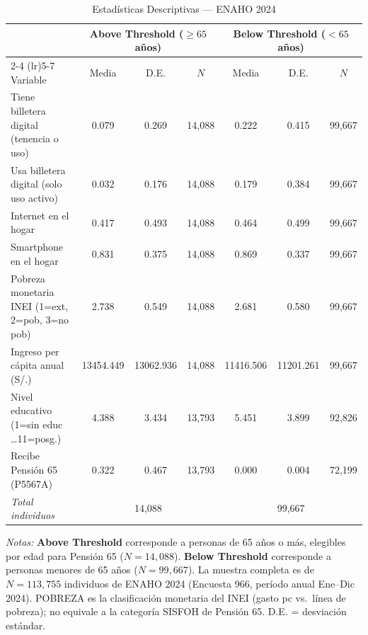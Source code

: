 \begin{table}[htbp]
\centering
\caption{Estadísticas Descriptivas — ENAHO 2024}
\label{tab:descriptivos}
\begin{threeparttable}
\begin{tabular}{l ccc ccc}
\toprule
& \multicolumn{3}{c}{\textbf{Above Threshold} ($\geq 65$ años)} & \multicolumn{3}{c}{\textbf{Below Threshold} ($< 65$ años)} \\
\cmidrule(lr){2-4} \cmidrule(lr){5-7}
Variable & Media & D.E. & $N$ & Media & D.E. & $N$ \\
\midrule
  Tiene billetera digital (tenencia o uso) & 0.079 & 0.269 & 14{,}088 & 0.222 & 0.415 & 99{,}667 \\
  Usa billetera digital (solo uso activo) & 0.032 & 0.176 & 14{,}088 & 0.179 & 0.384 & 99{,}667 \\
  Internet en el hogar & 0.417 & 0.493 & 14{,}088 & 0.464 & 0.499 & 99{,}667 \\
  Smartphone en el hogar & 0.831 & 0.375 & 14{,}088 & 0.869 & 0.337 & 99{,}667 \\
  Pobreza monetaria INEI (1=ext, 2=pob, 3=no pob) & 2.738 & 0.549 & 14{,}088 & 2.681 & 0.580 & 99{,}667 \\
  Ingreso per cápita anual (S/.) & 13454.449 & 13062.936 & 14{,}088 & 11416.506 & 11201.261 & 99{,}667 \\
  Nivel educativo (1=sin educ \ldots 11=posg.) & 4.388 & 3.434 & 13{,}793 & 5.451 & 3.899 & 92{,}826 \\
  Recibe Pensión 65 (P5567A) & 0.322 & 0.467 & 13{,}793 & 0.000 & 0.004 & 72{,}199 \\
\midrule
  \textit{Total individuos} & \multicolumn{3}{c}{14{,}088} & \multicolumn{3}{c}{99{,}667} \\
\bottomrule
\end{tabular}
\begin{tablenotes}[flushleft]
\footnotesize
\item \textit{Notas:} \textbf{Above Threshold} corresponde a personas de 65 años o más, elegibles por edad para Pensión 65 ($N=14{,}088$). \textbf{Below Threshold} corresponde a personas menores de 65 años ($N=99{,}667$). La muestra completa es de $N=113{,}755$ individuos de ENAHO 2024 (Encuesta 966, período anual Ene--Dic 2024). POBREZA es la clasificación monetaria del INEI (gasto pc vs.\ línea de pobreza); no equivale a la categoría SISFOH de Pensión 65. D.E. = desviación estándar.
\end{tablenotes}
\end{threeparttable}
\end{table}
